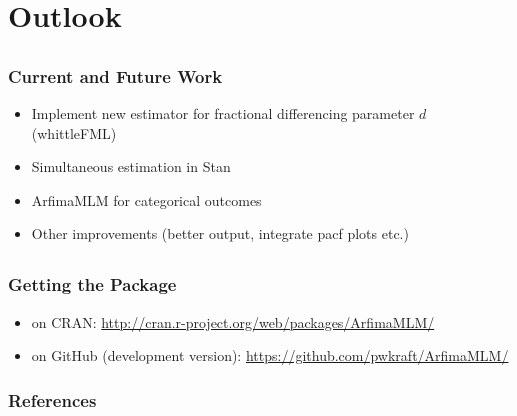 \documentclass{beamer}\usepackage[]{graphicx}\usepackage[]{color}
\begin{document}
\section{Outlook}

\subsection{}
\begin{frame}
\frametitle{Current and Future Work}
\begin{itemize}
\item Implement new estimator for fractional differencing parameter $d$ (whittleFML)
\item Simultaneous estimation in Stan
\item ArfimaMLM for categorical outcomes
\item Other improvements (better output, integrate pacf plots etc.)
\end{itemize}
\end{frame}

\subsection{}
\begin{frame}
\frametitle{Getting the Package}
\begin{itemize}
\item on CRAN: \url{http://cran.r-project.org/web/packages/ArfimaMLM/}
\item on GitHub (development version): \url{https://github.com/pwkraft/ArfimaMLM/}
\end{itemize}
\end{frame}

 \begin{frame}
   \frametitle{References}
   \def\newblock{\hskip .11em plus .33em minus .07em}
   
   
 \end{frame}
\end{document}
